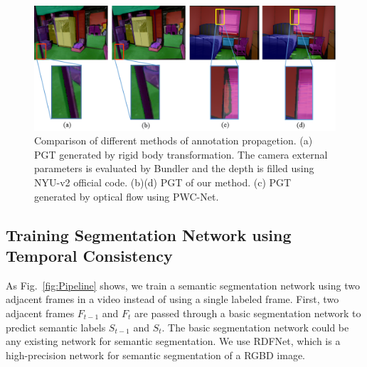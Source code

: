 \begin{figure}[t]
	\centering
	\includegraphics[width=\columnwidth]{figure/PGT_compared.png}
	\caption{Comparison of different methods of annotation propagetion. (a) PGT generated by rigid body transformation. The camera external parameters is evaluated by Bundler and the depth is filled using NYU-v2 official code. (b)(d) PGT of our method. (c) PGT generated by optical flow using PWC-Net\cite{Sun2018}.}
	\label{fig:PGT_Com}
\end{figure}

\subsection{Training Segmentation Network using Temporal Consistency}
%
As Fig.~\ref{fig:Pipeline} shows, we train a semantic segmentation network using two adjacent frames in a video instead of using a single labeled frame.  
% 
First, two adjacent frames $F_{t-1}$ and $F_t$ are passed through a basic segmentation network to predict semantic labels $S_{t-1}$ and $S_{t}$.
%
The basic segmentation network could be any existing network for semantic segmentation. 
We use RDFNet\cite{Park2017}, which is a high-precision network for semantic segmentation of a RGBD image.



